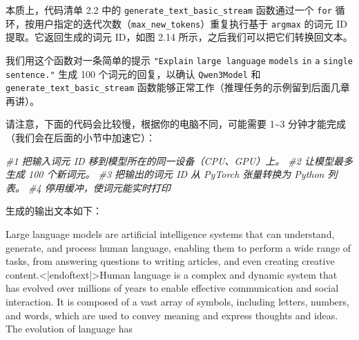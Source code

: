 本质上，代码清单 2.2 中的 \texttt{generate\_text\_basic\_stream} 函数通过一个 \texttt{for} 循环，按用户指定的迭代次数（\texttt{max\_new\_tokens}）重复执行基于 \texttt{argmax} 的词元 ID 提取。它返回生成的词元 ID，如图 2.14 所示，之后我们可以把它们转换回文本。

我们用这个函数对一条简单的提示 \texttt{"}\texttt{Explain} \texttt{large language} \texttt{models} \texttt{in} \texttt{a} \texttt{single} \texttt{sentence.}\texttt{"} 生成 100 个词元的回复，以确认 \texttt{Qwen3Model} 和 \texttt{generate\_text\_basic\_stream} 函数能够正常工作（推理任务的示例留到后面几章再讲）。

请注意，下面的代码会比较慢，根据你的电脑不同，可能需要 1\textasciitilde{}3 分钟才能完成（我们会在后面的小节中加速它）：

{\noindent\small\textit{\#1 把输入词元 ID 移到模型所在的同一设备（CPU、GPU）上。 \newline \#2 让模型最多生成 100 个新词元。 \newline \#3 把输出的词元 ID 从 PyTorch 张量转换为 Python 列表。 \newline \#4 停用缓冲，使词元能实时打印}\par}

生成的输出文本如下：

\begin{codebox}
 Large language models are artificial intelligence systems that can
understand, generate, and process human language, enabling them to
perform a wide range of tasks, from answering questions to writing
articles, and even creating creative content.<|endoftext|>Human language
is a complex and dynamic system that has evolved over millions of
years to enable effective communication and social interaction. It is
composed of a vast array of symbols, including letters, numbers, and
words, which are used to convey meaning and express thoughts and
ideas. The evolution of language has
\end{codebox}

